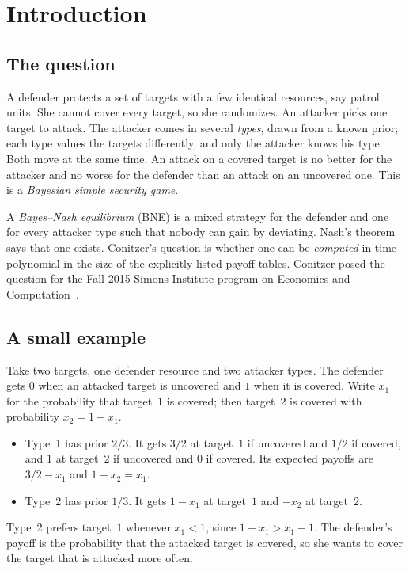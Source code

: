 \chapter{Introduction}\label{ch:intro}

\section{The question}

A defender protects a set of targets with a few identical resources, say patrol units. She cannot cover
every target, so she randomizes. An attacker picks one target to attack. The attacker comes in several
\emph{types}, drawn from a known prior; each type values the targets differently, and only the attacker
knows his type. Both move at the same time. An attack on a covered target is no better for the attacker and
no worse for the defender than an attack on an uncovered one. This is a \emph{Bayesian simple security
game}.

A \emph{Bayes--Nash equilibrium} (BNE) is a mixed strategy for the defender and one for every attacker
type such that nobody can gain by deviating. Nash's theorem says that one exists. Conitzer's question
is whether one can be \emph{computed} in time polynomial in the size of the explicitly listed
payoff tables. Conitzer posed the question for the Fall 2015 Simons Institute
program on Economics and Computation~\cite{conitzer26}.

\section{A small example}\label{sec:intro-example}

Take two targets, one defender resource and two attacker types. The defender gets $0$ when an attacked
target is uncovered and $1$ when it is covered. Write $x_1$ for the probability that target~$1$ is
covered; then target~$2$ is covered with probability $x_2=1-x_1$.
\begin{itemize}[nosep]
\item Type~1 has prior $2/3$. It gets $3/2$ at target~$1$ if uncovered and $1/2$ if covered, and $1$ at
target~$2$ if uncovered and $0$ if covered. Its expected payoffs are $3/2-x_1$ and $1-x_2=x_1$.
\item Type~2 has prior $1/3$. It gets $1-x_1$ at target~$1$ and $-x_2$ at target~$2$.
\end{itemize}
Type~2 prefers target~$1$ whenever $x_1<1$, since $1-x_1>x_1-1$. The defender's payoff is the
probability that the attacked target is covered, so she wants to cover the target that is attacked
more often.


